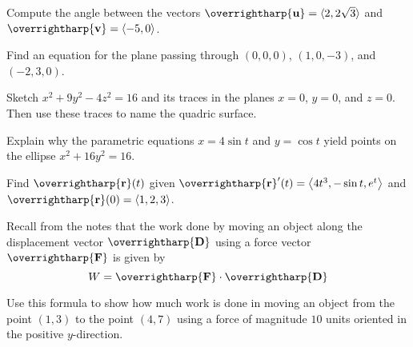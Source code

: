 \documentclass[12pt]{exam}
\newcommand{\harpvec}[1]{\overrightharp{\ensuremath{\mathbf{#1}}}}
\newcommand{\vect}[1]{\harpvec{#1}}
\newcommand{\<}{\langle}
\renewcommand{\>}{\rangle}
\begin{document}
\begin{questions}

\setcounter{question}{0}

\question[5]
  Compute the angle between the vectors
  $\vect{u}=\<2,2\sqrt{3}\>$ and $\vect{v}=\<-5,0\>$.

\newpage

\question[5]
  Find an equation for the plane passing through $(0,0,0)$,
  $(1,0,-3)$, and $(-2,3,0)$.

\newpage

\question[5]
  Sketch $x^2+9y^2-4z^2=16$ and its traces in the planes $x=0$, $y=0$,
  and $z=0$.
  Then use these traces to name the quadric surface.

\newpage

\question[5]
  Explain why the parametric equations $x=4\sin t$ and $y=\cos t$
  yield points on the ellipse $x^2+16y^2=16$.

\newpage

\question[5]
  Find $\vect{r}(t)$ given
  $\vect{r}'(t) = \left\<4t^3, -\sin t, e^t\right\>$
  and $\vect{r}(0) = \<1, 2, 3\>$.

\newpage

\question[5]
  Recall from the notes that the work done by moving an object
  along the displacement vector $\vect{D}$ using a force vector
  $\vect{F}$ is given by
  \[
    W = \vect{F}\cdot\vect{D}
  \]

  Use this formula to show how much work is done in moving an
  object from the point $(1,3)$ to the point $(4,7)$ using
  a force of magnitude $10$ units oriented
  in the positive $y$-direction.
\end{questions}
\end{document}
